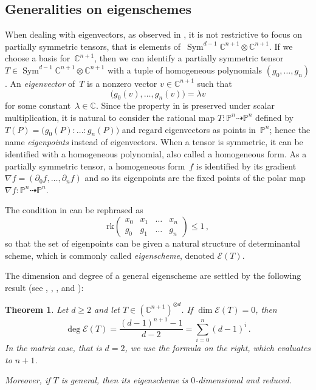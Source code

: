 \documentclass[a4paper, 11pt, reqno]{amsart}
\theoremstyle{plain}
\newtheorem{theoremintro}{Theorem}
\theoremstyle{definition}
\newcommand{\C}{\mathbb{C}}
\newcommand{\p}{\mathbb{P}}
\newcommand{\de}{\partial}
\newcommand{\rk}{\ensuremath{\mathrm{rk}}}
\newcommand{\Eig}[1]{\mathcal{E}\!\left( {#1} \right)}
\newcommand{\Sym}{\operatorname{Sym}}
\begin{document}
\subsection*{Generalities on eigenschemes}
When dealing with eigenvectors, as observed in \cite{ASS},
it is not restrictive to focus on partially symmetric tensors, that is elements of~$\Sym^{d-1}\C^{n+1} \otimes \C^{n+1}$.
If we choose a basis for~$\C^{n+1}$, then we can identify a partially symmetric tensor $T \in \Sym^{d-1}\C^{n+1} \otimes \C^{n+1}$ with a tuple of homogeneous polynomials $(g_0, \dotsc, g_n)$. An \emph{eigenvector} of~$T$ is a nonzero vector $v \in \C^{n+1}$ such that
%
\begin{equation}
\label{eq:eigenvector_definition}
  \bigl( g_0(v), \dotsc, g_n(v) \bigr) = \lambda v
\end{equation}
%
for some constant~$\lambda \in \C$.
Since the property in  is preserved under scalar multiplication, 
it is natural to consider the rational map $T \colon \p^n \dashrightarrow \p^n$ defined by $T(P) = \bigl(g_0(P): \ldots: g_n(P)\bigr)$ 
and regard eigenvectors as points in~$\p^n$; hence the name \emph{eigenpoints} instead of eigenvectors.
When a tensor is symmetric, it can be identified with a homogeneous polynomial, also called a homogeneous form.
As a partially symmetric tensor, a homogeneous form~$f$ is identified by its gradient $\nabla f = (\de_0 f, \dotsc, \de_n f)$ and so its eigenpoints are the fixed points of the polar map $\nabla f \colon \p^n \dasharrow \p^n$.

The condition in  can be rephrased as
%
\begin{equation}
\label{eq:def_matrix_general}
  \rk
  \begin{pmatrix}
    x_0 & x_1 & \dots & x_n \\
    g_0 & g_1 & \dots & g_n
  \end{pmatrix} \le 1 \,,
\end{equation}
%
so that the set of eigenpoints can be given a natural structure of determinantal scheme, which is commonly called \emph{eigenscheme}, denoted $\Eig{T}$.

The dimension and degree of a general eigenscheme are settled by the following result (see \cite[Theorem 2.1]{CartSturm}, \cite{ASS}, \cite{OO}, and \cite[Equation~5.2]{Abo}):

\begin{theoremintro}
\label{thm:nonempty}
Let $d \ge 2$ and let $T \in (\C^{n+1})^{\otimes d}$.
If $\dim \Eig{T}=0$, then 
%
\[
  \deg \Eig{T} =
  \frac{(d-1)^{n+1}-1}{d-2} =
  \sum_{i=0}^{n} (d-1)^i \,.
\]
%
In the matrix case, that is $d = 2$, we use the formula on the right, which evaluates to $n+1$.

Moreover, if $T$ is general, then its eigenscheme is $0$-dimensional and reduced.
\end{theoremintro}
\end{document}
